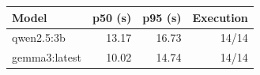 \begin{tabularx}{\linewidth}{Xrrr}
\toprule
Model & p50 (s) & p95 (s) & Execution \\
\midrule
qwen2.5:3b & 13.17 & 16.73 & 14/14 \\
gemma3:latest & 10.02 & 14.74 & 14/14 \\
\bottomrule
\end{tabularx}

